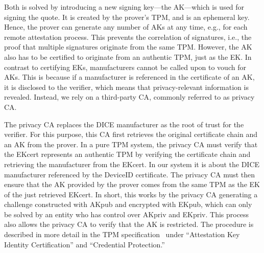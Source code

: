 
Both is solved by introducing a new signing key---the \ac{AK}---which is used for signing the quote.
It is created by the prover's TPM, and is an ephemeral key.
Hence, the prover can generate any number of \acp{AK} at any time, e.g., for each remote attestation process.
This prevents the correlation of signatures, i.e., the proof that multiple signatures originate from the same TPM\@.
However, the AK also has to be certified to originate from an authentic TPM, just as the EK\@.
In contrast to certifying \acp{EK}, manufacturers cannot be called upon to vouch for \acp{AK}.
This is because if a manufacturer is referenced in the certificate of an AK, it is disclosed to the verifier, which means that privacy-relevant information is revealed.
Instead, we rely on a third-party \ac{CA}, commonly referred to as privacy \ac{CA}\@.

The privacy \ac{CA} replaces the DICE manufacturer as the root of trust for the verifier.
For this purpose, this \ac{CA} first retrieves the original certificate chain and an AK from the prover.
In a pure TPM system, the privacy \ac{CA} must verify that the EKcert represents an authentic TPM by verifying the certificate chain and retrieving the manufacturer from the EKcert.
In our system it is about the DICE manufacturer referenced by the DeviceID certificate.
The privacy \ac{CA} must then ensure that the AK provided by the prover comes from the same TPM as the EK of the just retrieved EKcert.
In short, this works by the privacy \ac{CA} generating a challenge constructed with AKpub and encrypted with EKpub, which can only be solved by an entity who has control over AKpriv and EKpriv\@.
This process also allows the privacy \ac{CA} to verify that the AK is restricted.
The procedure is described in more detail in the TPM specification~\cite{tpm20} under ``Attestation Key Identity Certification'' and ``Credential Protection.''

